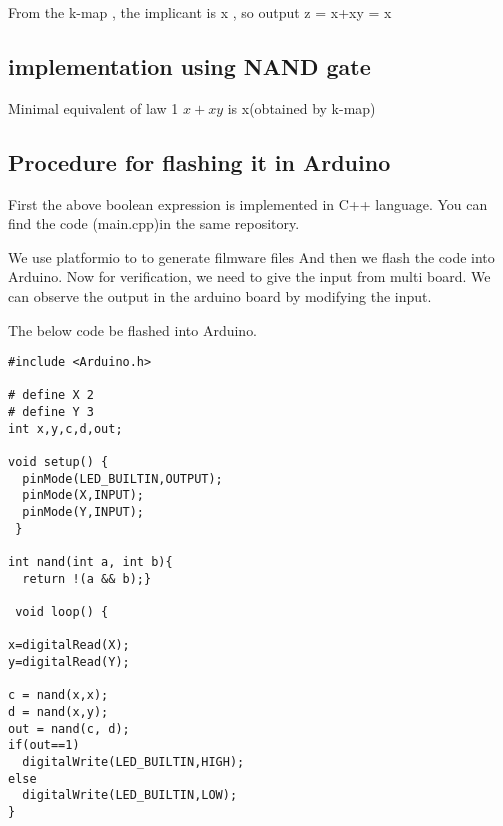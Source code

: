 \documentclass[12pt]{article}
\begin{document}
 From the k-map , the implicant is x , so output z = x+xy = x \\

\subsection{implementation using NAND gate }
 Minimal equivalent of law 1 $x+xy$ is x(obtained by k-map)
 
     \begin{center}
    \end{center}
    
\subsection{Procedure for flashing it in Arduino}

First the above boolean expression is implemented in C++ language. You can find the code (main.cpp)in the same repository.

We use platformio to to generate filmware files And then we flash the code into Arduino.  Now for verification, we need to give the input from multi board. We can observe the output in the arduino board by modifying the input.

\newpage
The below code be flashed into Arduino.
\begin{verbatim}
#include <Arduino.h>

# define X 2
# define Y 3
int x,y,c,d,out;

void setup() {
  pinMode(LED_BUILTIN,OUTPUT);
  pinMode(X,INPUT);
  pinMode(Y,INPUT);
 }

int nand(int a, int b){
  return !(a && b);}

 void loop() {

x=digitalRead(X);
y=digitalRead(Y);
      			
c = nand(x,x);
d = nand(x,y);       					
out = nand(c, d);
if(out==1)
  digitalWrite(LED_BUILTIN,HIGH);
else
  digitalWrite(LED_BUILTIN,LOW);
}
\end{verbatim}
\end{document}
